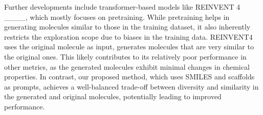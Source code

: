 Further developments include transformer-based models like REINVENT 4 ____, which mostly focuses on pretraining. While pretraining helps in generating molecules similar to those in the training dataset, it also inherently restricts the exploration scope due to biases in the training data.
REINVENT4 uses the original molecule as input, generates molecules that are very similar to the original ones. This likely contributes to its relatively poor performance in other metrics, as the generated molecules exhibit minimal changes in chemical properties. 
In contrast, our proposed method, which uses SMILES and scaffolds as prompts, achieves a well-balanced trade-off between diversity and similarity in the generated and original molecules, potentially leading to improved performance.